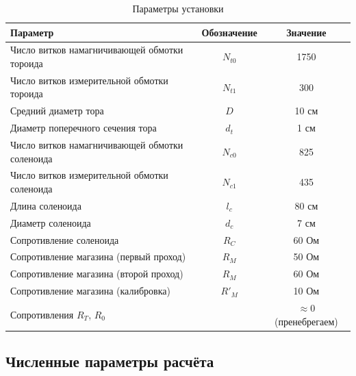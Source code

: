 \documentclass[a4paper]{article}
\begin{document}
	\begin{table}[h]
		\centering
		\caption{Параметры установки}
		\label{tab:params}
		\begin{tabular}{|l|c|c|}
			\hline
			Параметр & Обозначение & Значение \\
			\hline
			Число витков намагничивающей обмотки тороида & $N_{t0}$ & 1750 \\
			\hline
			Число витков измерительной обмотки тороида & $N_{t1}$ & 300 \\
			\hline
			Средний диаметр тора & $D$ & 10 см \\
			\hline
			Диаметр поперечного сечения тора & $d_t$ & 1 см \\
			\hline
			Число витков намагничивающей обмотки соленоида & $N_{c0}$ & 825 \\
			\hline
			Число витков измерительной обмотки соленоида & $N_{c1}$ & 435 \\
			\hline
			Длина соленоида & $l_c$ & 80 см \\
			\hline
			Диаметр соленоида & $d_c$ & 7 см \\
			\hline
			Сопротивление соленоида & $R_C$ & 60 Ом \\
			\hline
			Сопротивление магазина (первый проход) & $R_M$ & 50 Ом \\
			\hline
			Сопротивление магазина (второй проход) & $R_M$ & 60 Ом \\
			\hline
			Сопротивление магазина (калибровка) & $R'_M$ & 10 Ом \\
			\hline
			Сопротивления $R_T$, $R_0$ & & $\approx 0$ (пренебрегаем) \\
			\hline
		\end{tabular}
	\end{table}
	
	\subsection{Численные параметры расчёта}
	
\end{document}
